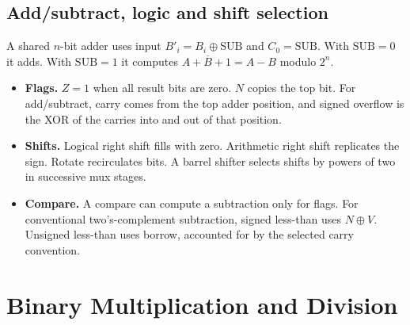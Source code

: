 \documentclass[12pt,a4paper]{article}
\begin{document}
\subsection{Add/subtract, logic and shift selection}
A shared $n$-bit adder uses input $B'_i=B_i\oplus\mathrm{SUB}$ and $C_0=\mathrm{SUB}$. With $\mathrm{SUB}=0$ it adds. With $\mathrm{SUB}=1$ it computes $A+\overline B+1=A-B$ modulo $2^n$.
\begin{tcolorbox}[tikzbox,title={Result selection in a small ALU},unbreakable]
\centering
{}
\end{tcolorbox}

\begin{itemize}[leftmargin=*,itemsep=3pt]
\item \textbf{Flags.} $Z=1$ when all result bits are zero. $N$ copies the top bit. For add/subtract, carry comes from the top adder position, and signed overflow is the XOR of the carries into and out of that position.
\item \textbf{Shifts.} Logical right shift fills with zero. Arithmetic right shift replicates the sign. Rotate recirculates bits. A barrel shifter selects shifts by powers of two in successive mux stages.
\item \textbf{Compare.} A compare can compute a subtraction only for flags. For conventional two's-complement subtraction, signed less-than uses $N\oplus V$. Unsigned less-than uses borrow, accounted for by the selected carry convention.
\end{itemize}

\section{Binary Multiplication and Division}
\end{document}
